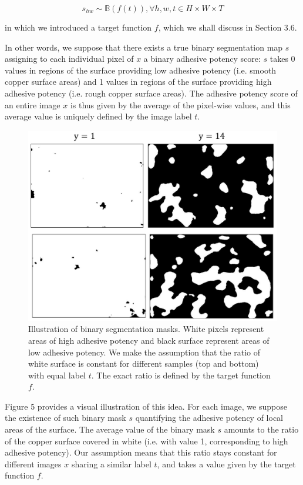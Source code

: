 \documentclass[10pt,twocolumn,letterpaper]{article}
\begin{document}
\begin{equation}
  s_{hw} \sim \mathbb{B}(f(t)), \forall h,w,t \in H \times W \times T
\end{equation}

in which we introduced a target function $f$, which we shall discuss in Section 3.6.

In other words, we suppose that there exists a true binary segmentation map
$s$ assigning to each individual pixel of $x$ a binary adhesive potency score:
$s$ takes 0 values in regions of the surface providing low adhesive potency (i.e. smooth copper surface areas)
and 1 values in regions of the surface providing high adhesive potency (i.e. rough copper surface areas).
The adhesive potency score of an entire image $x$ is thus given by the average of the pixel-wise values,
and this average value is uniquely defined by the image label $t$.

\begin{figure}[h]
\centering
\includegraphics[width=0.9\linewidth]{"./figures/Figure5"}
\caption{
Illustration of binary segmentation masks. 
White pixels represent areas of high adhesive potency
and black surface represent areas of low adhesive potency.
We make the assumption that the ratio of white surface is 
constant for different samples (top and bottom) with equal label $t$.
The exact ratio is defined by the target function $f$.
}
\end{figure}

Figure 5 provides a visual illustration of this idea.
For each image, we suppose the existence of such binary mask $s$
quantifying the adhesive potency of local areas of the surface.
The average value of the binary mask $s$ amounts to the ratio of the copper surface covered in white 
(i.e. with value 1, corresponding to high adhesive potency).
Our assumption means that this ratio stays constant for different 
images $x$ sharing a similar label $t$,
and takes a value given by the target function $f$.
\end{document}
